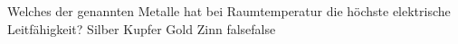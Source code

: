     {Welches der genannten Metalle hat bei Raumtemperatur die höchste elektrische Leitfähigkeit?}
    {Silber}
    {Kupfer}
    {Gold}
    {Zinn}
    {false}{false}